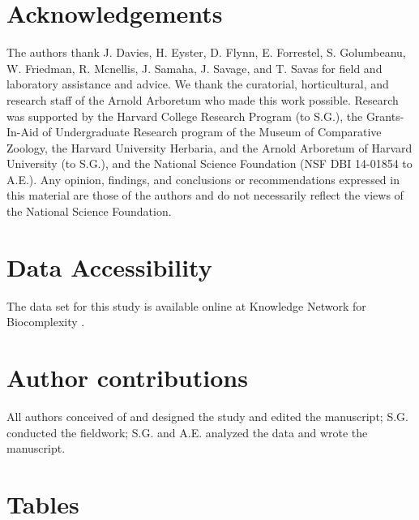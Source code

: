 \documentclass{article}
\begin{document}
\section*{Acknowledgements}
The authors thank J. Davies, H. Eyster, D. Flynn, E. Forrestel, S. Golumbeanu, W. Friedman, R. Mcnellis, J. Samaha, J. Savage, and T. Savas for field and laboratory assistance and advice. We thank the curatorial, horticultural, and research staff of the Arnold Arboretum who made this work possible. Research was supported by the Harvard College Research Program (to S.G.), the Grants-In-Aid of Undergraduate Research program of the Museum of Comparative Zoology, the Harvard University Herbaria, and the Arnold Arboretum of Harvard University (to S.G.), and the National Science Foundation (NSF DBI 14-01854 to A.E.). Any opinion, findings, and conclusions or recommendations expressed in this material are those of the authors and do not necessarily reflect the views of the National Science Foundation.

\section*{Data Accessibility}
The data set for this study is available online at Knowledge Network for Biocomplexity \citep{gee2017}. 

\section*{Author contributions} All authors conceived of and designed the study and edited the manuscript; S.G. conducted the fieldwork; S.G. and A.E. analyzed the data and wrote the manuscript.



\section* {Tables}
\end{document}
